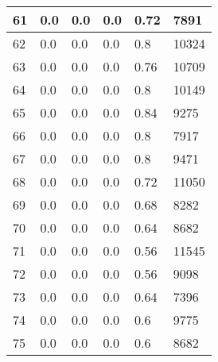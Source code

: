 \begin{longtable}{|l|l|l|l|l|l|}
61 & 0.0 & 0.0 & 0.0 & 0.72 & 7891 \\ \hline 
62 & 0.0 & 0.0 & 0.0 & 0.8 & 10324 \\ \hline 
63 & 0.0 & 0.0 & 0.0 & 0.76 & 10709 \\ \hline 
64 & 0.0 & 0.0 & 0.0 & 0.8 & 10149 \\ \hline 
65 & 0.0 & 0.0 & 0.0 & 0.84 & 9275 \\ \hline 
66 & 0.0 & 0.0 & 0.0 & 0.8 & 7917 \\ \hline 
67 & 0.0 & 0.0 & 0.0 & 0.8 & 9471 \\ \hline 
68 & 0.0 & 0.0 & 0.0 & 0.72 & 11050 \\ \hline 
69 & 0.0 & 0.0 & 0.0 & 0.68 & 8282 \\ \hline 
70 & 0.0 & 0.0 & 0.0 & 0.64 & 8682 \\ \hline 
71 & 0.0 & 0.0 & 0.0 & 0.56 & 11545 \\ \hline 
72 & 0.0 & 0.0 & 0.0 & 0.56 & 9098 \\ \hline 
73 & 0.0 & 0.0 & 0.0 & 0.64 & 7396 \\ \hline 
74 & 0.0 & 0.0 & 0.0 & 0.6 & 9775 \\ \hline 
75 & 0.0 & 0.0 & 0.0 & 0.6 & 8682 \\ \hline 
\end{longtable}